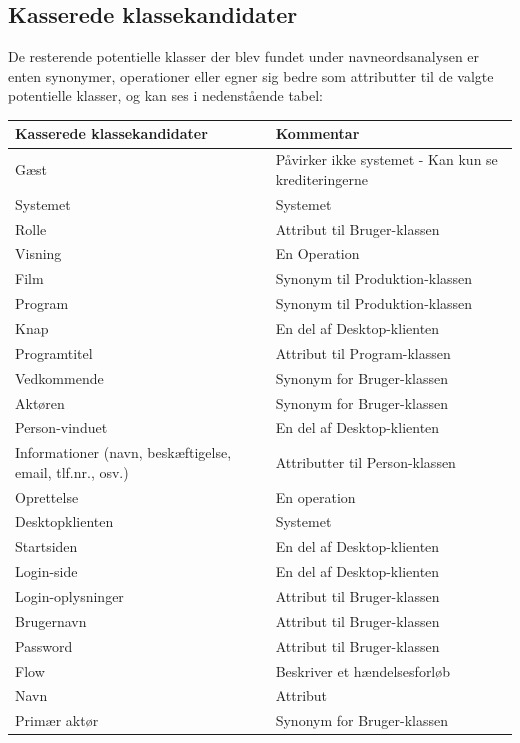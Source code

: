 \subsection{Kasserede klassekandidater}
De resterende potentielle klasser der blev fundet under navneordsanalysen er enten synonymer, operationer  eller egner sig bedre som attributter til de valgte potentielle klasser, og kan ses i nedenstående tabel: 

\begin{longtable}{|p{6cm}|p{10cm}|}
\hline
\textbf{Kasserede klassekandidater} & \textbf{Kommentar} \\
\hline
Gæst & Påvirker ikke systemet - Kan kun se krediteringerne\\
\hline
Systemet & Systemet  \\
\hline
Rolle   & Attribut til Bruger-klassen\\
\hline
Visning  & En Operation\\
\hline
Film & Synonym til Produktion-klassen\\ 
\hline
Program & Synonym til Produktion-klassen\\ 
\hline
Knap & En del af Desktop-klienten\\
\hline
Programtitel & Attribut til Program-klassen\\
\hline
Vedkommende & Synonym for Bruger-klassen\\
\hline
Aktøren &  Synonym for Bruger-klassen\\
\hline
Person-vinduet & En del af Desktop-klienten\\
\hline
Informationer (navn, beskæftigelse, email, tlf.nr., osv.) &  Attributter til Person-klassen\\
\hline
Oprettelse & En operation \\
\hline
Desktopklienten &  Systemet\\
\hline
Startsiden &  En del af Desktop-klienten\\
\hline
Login-side & En del af Desktop-klienten\\
\hline
Login-oplysninger & Attribut til Bruger-klassen\\
\hline
Brugernavn & Attribut til Bruger-klassen\\
\hline
Password & Attribut til Bruger-klassen\\
\hline
Flow & Beskriver et hændelsesforløb\\
\hline
Navn & Attribut \\
\hline
Primær aktør &  Synonym for Bruger-klassen\\
\hline

\end{longtable}
